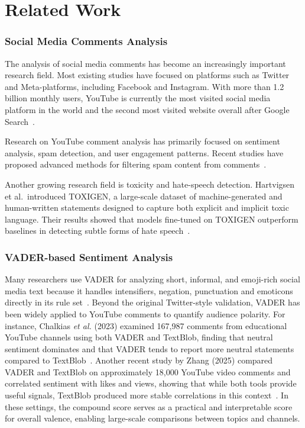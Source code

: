 \cleardoubleoddpage
\chapter{Related Work}

\subsection*{Social Media Comments Analysis}

The analysis of social media comments has become an increasingly important research field. Most existing studies have focused on platforms such as Twitter and Meta-platforms, including Facebook and Instagram. With more than 1.2 billion monthly users, YouTube is currently the most visited social media platform in the world and the second most visited website overall after Google Search~\cite{statista2024youtubeusers}.

Research on YouTube comment analysis has primarily focused on sentiment analysis, spam detection, and user engagement patterns. Recent studies have proposed advanced methods for filtering spam content from comments~\cite{singha2024spam}. 

Another growing research field is toxicity and hate-speech detection. Hartvigsen et al.\ introduced TOXIGEN, a large-scale dataset of machine-generated and human-written statements designed to capture both explicit and implicit toxic language. Their results showed that models fine-tuned on TOXIGEN outperform baselines in detecting subtle forms of hate speech~\cite{hartvigsen2022toxigen}.
\subsection*{VADER-based Sentiment Analysis}

Many researchers use VADER for analyzing short, informal, and emoji-rich social media text because it handles intensifiers, negation, punctuation and emoticons directly in its rule set~\cite{hutto2014vader}. Beyond the original Twitter-style validation, VADER has been widely applied to YouTube comments to quantify audience polarity. For instance, Chalkias \textit{et al.} (2023) examined 167,987 comments from educational YouTube channels using both VADER and TextBlob, finding that neutral sentiment dominates and that VADER tends to report more neutral statements compared to TextBlob~\cite{chalkias2023exploring}. Another recent study by Zhang (2025) compared VADER and TextBlob on approximately 18,000 YouTube video comments and correlated sentiment with likes and views, showing that while both tools provide useful signals, TextBlob produced more stable correlations in this context~\cite{zhang2025youtube}. In these settings, the compound score serves as a practical and interpretable score for overall valence, enabling large-scale comparisons between topics and channels.
